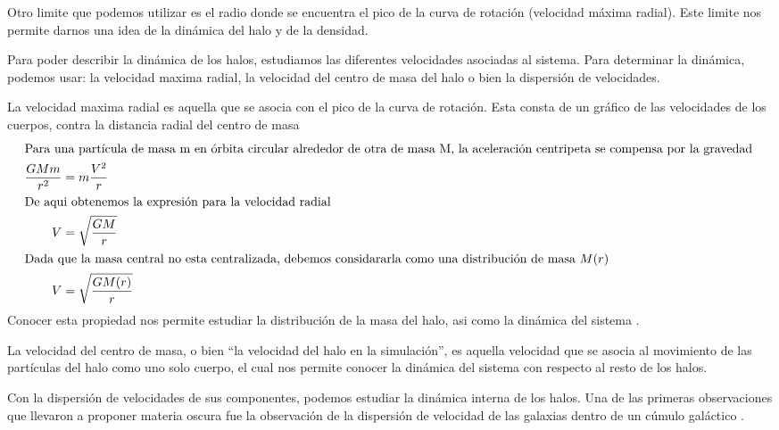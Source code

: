 Otro limite que podemos utilizar es el radio donde se encuentra el pico de la curva de rotación (velocidad máxima radial). Este limite nos permite darnos una idea de la dinámica del halo y de la densidad.

Para poder describir la dinámica de los halos, estudiamos las diferentes velocidades asociadas al sistema. Para determinar la dinámica, podemos usar: la velocidad maxima radial, la velocidad del centro de masa del halo o bien la dispersión de velocidades.

La velocidad maxima radial es aquella que se asocia con el pico de la curva de rotación. Esta consta de un gráfico de las velocidades de los cuerpos, contra la distancia radial del centro de masa 
\begin{align}
    \intertext{Para una partícula de masa m en órbita circular alrededor de otra de masa M, la aceleración centripeta se compensa por la gravedad }
    \frac{ G M m}{r^2} &= m \frac{ V^2 }{ r } \nonumber \\
    \intertext{De aqui obtenemos la expresión para la velocidad radial}
    V &= \sqrt{\frac{ G M }{ r } } \nonumber \\
    \intertext{Dada que la masa central no esta centralizada, debemos considararla como una distribución de masa $M(r)$}
    V &= \sqrt{\frac{ G M(r) }{ r } }
\end{align}
Conocer esta propiedad nos permite estudiar la distribución de la masa del halo, asi como la dinámica del sistema \cite{2001BookScienceCosmo}.

La velocidad del centro de masa, o bien ``la velocidad del halo en la simulación'', es aquella velocidad que se asocia al movimiento de las partículas del halo como uno solo cuerpo, el cual nos permite conocer la dinámica del sistema con respecto al resto de los halos.

Con la dispersión de velocidades {\blues de sus componentes,} podemos estudiar la dinámica interna de los halos. {\blues Una de las primeras observaciones que llevaron a proponer materia oscura fue la observación de la dispersión de velocidad  de las galaxias dentro de un cúmulo galáctico \cite{1937ApJ....86..217Z}. }





